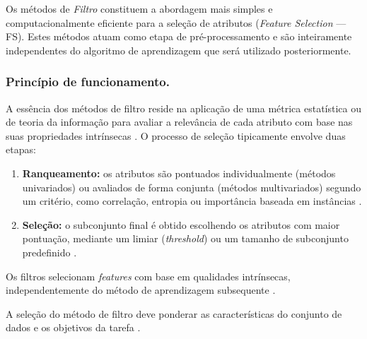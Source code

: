 Os métodos de \emph{Filtro} constituem a abordagem mais simples e computacionalmente eficiente para a seleção de atributos (\emph{Feature Selection} — FS). Estes métodos atuam como etapa de pré-processamento e são inteiramente independentes do algoritmo de aprendizagem que será utilizado posteriormente. \cite{Theng2024,Dhal2022,EBRAHIMIWARKIANI2025129372,10.1007/978-3-031-23092-9_12}

\subsubsection*{Princípio de funcionamento.}
A essência dos métodos de filtro reside na aplicação de uma métrica estatística ou de teoria da informação para avaliar a relevância de cada atributo com base nas suas propriedades intrínsecas \cite{Theng2024,SolorioFernandez2020,Bouchlaghem2022}. O processo de seleção tipicamente envolve duas etapas:
\begin{enumerate}
    \item \textbf{Ranqueamento:} os atributos são pontuados individualmente (métodos univariados) ou avaliados de forma conjunta (métodos multivariados) segundo um critério, como correlação, entropia ou importância baseada em instâncias \cite{Bouchlaghem2022, geng2007feature}.
    \item \textbf{Seleção:} o subconjunto final é obtido escolhendo os atributos com maior pontuação, mediante um limiar (\emph{threshold}) ou um tamanho de subconjunto predefinido \cite{Theng2024,jovic2015review}.
\end{enumerate}


Os filtros selecionam \emph{features} com base em qualidades intrínsecas, independentemente do método de aprendizagem subsequente \cite{EBRAHIMIWARKIANI2025129372}.

\bigskip
A seleção do método de filtro deve ponderar as características do conjunto de dados e os objetivos da tarefa \cite{Theng2024}.

